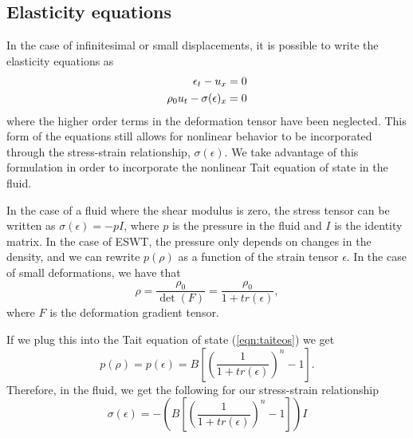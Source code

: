 \documentclass{article}
\begin{document}
\subsection{Elasticity equations}
\label{sec:elasticity}
In the case of infinitesimal or small displacements, it is possible to write the elasticity equations as 
\begin{align}
 \epsilon_t - u_x &= 0 \label{eqn:nlelast}\\
 \rho_0 u_t - \sigma(\epsilon)_x &= 0  \notag\\
\end{align}
where the higher order terms in the deformation tensor have been neglected.  This form of the equations 
still allows for nonlinear behavior to be incorporated through the stress-strain relationship, $
\sigma(\epsilon)$.  We take advantage of this formulation in order to incorporate the nonlinear Tait 
equation of state in the fluid. 

In the case of a fluid where the shear modulus is zero, the stress tensor can be written as $
\sigma(\epsilon) = -pI$, where $p$ is the pressure in the fluid and $I$ is the identity matrix.  In the case of 
ESWT, the pressure only depends on changes in the density, and we can rewrite $p(\rho)$ as a function 
of the strain tensor $\epsilon$.  In the case of small deformations, we have that 
\begin{equation}
\rho = \frac{\rho_0}{\det(F)} = \frac{\rho_0}{1+tr(\epsilon)},
\end{equation}
where $F$ is the deformation gradient tensor.

If we plug this into the Tait equation of state (\ref{eqn:taiteos}) we get
\begin{equation}
p(\rho) = p(\epsilon) = B\left[ \left(\frac{1}{1 + tr(\epsilon)}\right)^n - 1\right].  
\end{equation} 
Therefore, in the fluid, we get the following for our stress-strain relationship 
\begin{equation}
\sigma(\epsilon) = -(B\left[ \left(\frac{1}{1 + tr(\epsilon)}\right)^n - 1\right]) I
\end{equation} 
\end{document}
